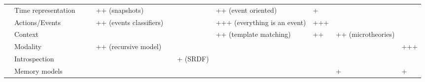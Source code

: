 \begin{landscape}
\begin{table}
\begin{center}
\begin{tabular}{p{0.2cm}p{3.4cm}p{1.6cm}p{1.3cm}p{1.7cm}p{1.5cm}p{2cm}p{2cm}p{1.4cm}p{1.4cm}|p{2cm}}
                                                               & Time representation &                           &                             & ++ (snapshots)              &                             &                                    & ++ (event oriented)                             & +                             &                               &                                               \\
                                                                    & Actions/Events &                           &                             & ++ (events classifiers)     &                             &                                    & +++ (everything is an event)                    & +++                           &                               &                                               \\
                                                                           & Context &                           &                             &                             &                             &                                    & ++ (template matching)                          & ++                            & ++ (microtheories)            &                                               \\
                                                                          & Modality &                           &                             & ++ (recursive model)        &                             &                                    &                                                 &                               &                               & +++                                           \\
                                                                     & Introspection &                           &                             &                             &                             & + (SRDF) \cite{Kunze2011}          &                                                 &                               &                               &                                               \\
                                                                     & Memory models &                           &                             &                             &                             &                                    &                                                 &                               & +                             & +                                             \\

\end{tabular}
\end{center}
\end{table}
\end{landscape}
